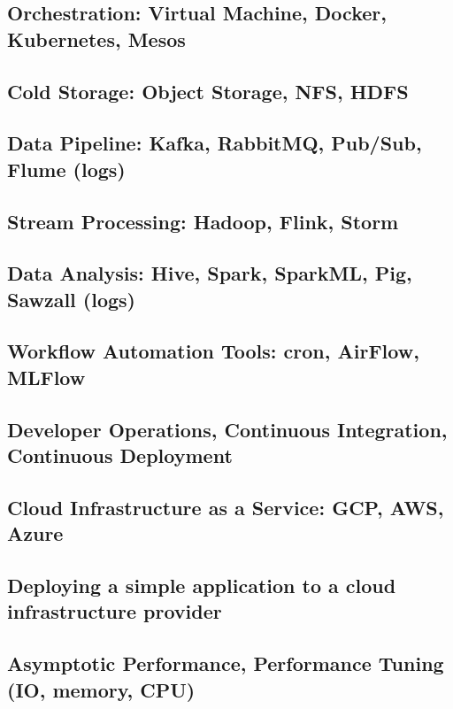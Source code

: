   \subsection{Orchestration: Virtual Machine, Docker, Kubernetes, Mesos}
  \subsection{Cold Storage: Object Storage, NFS, HDFS}
  \subsection{Data Pipeline: Kafka, RabbitMQ, Pub/Sub, Flume (logs)}
  \subsection{Stream Processing: Hadoop, Flink, Storm}
  \subsection{Data Analysis: Hive, Spark, SparkML, Pig, Sawzall (logs)}

\subsection{Workflow Automation Tools: cron, AirFlow, MLFlow}

\subsection{Developer Operations, Continuous Integration, Continuous Deployment}

\subsection{Cloud Infrastructure as a Service: GCP, AWS, Azure}

\subsection{Deploying a simple application to a cloud infrastructure provider}

\subsection{Asymptotic Performance, Performance Tuning (IO, memory, CPU)}
